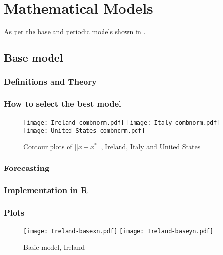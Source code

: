 \section{Mathematical Models}
\label{ch:mathmodel}

As per the base and periodic models shown in \cite{grigor20}.

\subsection{Base model}

\subsubsection{Definitions and Theory}

\subsubsection{How to select the best model}

\begin{figure}[H]
  \texttt{[image: Ireland-combnorm.pdf]} \label{fig:ireland-combnorm}
\endminipage\hfill
{}
  \texttt{[image: Italy-combnorm.pdf]} \label{fig:italy-combnorm}
\endminipage\hfill
{}
  \texttt{[image: United States-combnorm.pdf]} \label{fig:usa-combnorm}
\endminipage\hfill
\caption{Contour plots of $||x-x^*||$, Ireland, Italy and United States}
\end{figure}

\subsubsection{Forecasting}

\subsubsection{Implementation in R}

\subsubsection{Plots}

\begin{figure}[H]
  \texttt{[image: Ireland-basexn.pdf]} \label{fig:ireland-basexn}
\endminipage\hfill
{}
  \texttt{[image: Ireland-baseyn.pdf]} \label{fig:ireland-baseyn}
\endminipage
\caption{Basic model, Ireland}
\end{figure}

